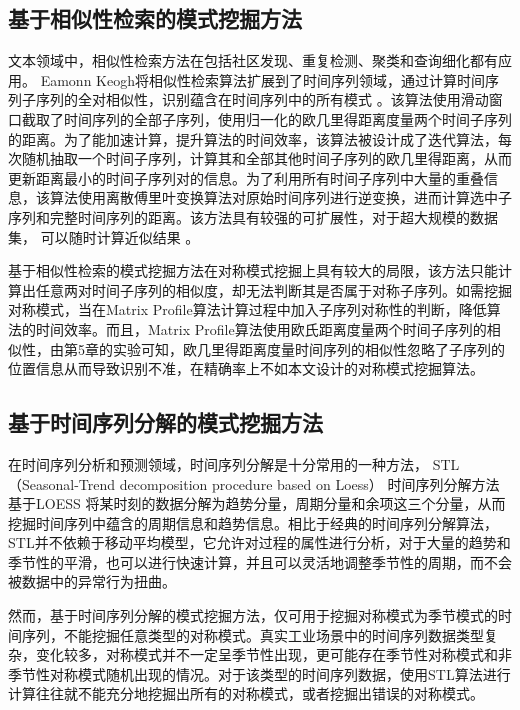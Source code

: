 \subsection{基于相似性检索的模式挖掘方法}
文本领域中，相似性检索方法在包括社区发现、重复检测、聚类和查询细化都有应用\cite{DBLP:conf/www/BayardoMS07}。
Eamonn Keogh将相似性检索算法扩展到了时间序列领域，通过计算时间序列子序列的全对相似性，识别蕴含在时间序列中的所有模式
\cite{DBLP:conf/kdd/RakthanmanonCMBWZZK12}。该算法使用滑动窗口截取了时间序列的全部子序列，使用归一化的欧几里得距离度量两个时间子序列的距离。为了能加速计算，提升算法的时间效率，该算法被设计成了迭代算法，每次随机抽取一个时间子序列，计算其和全部其他时间子序列的欧几里得距离，从而更新距离最小的时间子序列对的信息。为了利用所有时间子序列中大量的重叠信息，该算法使用离散傅里叶变换算法对原始时间序列进行逆变换，进而计算选中子序列和完整时间序列的距离。该方法具有较强的可扩展性，对于超大规模的数据集，
可以随时计算近似结果
\cite{DBLP:conf/icdm/ZhuZSYFMBK16}。

基于相似性检索的模式挖掘方法在对称模式挖掘上具有较大的局限，该方法只能计算出任意两对时间子序列的相似度，却无法判断其是否属于对称子序列。如需挖掘对称模式，当在Matrix Profile算法计算过程中加入子序列对称性的判断，降低算法的时间效率。而且，Matrix Profile算法使用欧氏距离度量两个时间子序列的相似性，由第5章的实验可知，欧几里得距离度量时间序列的相似性忽略了子序列的位置信息从而导致识别不准，在精确率上不如本文设计的对称模式挖掘算法。

\subsection{基于时间序列分解的模式挖掘方法}
在时间序列分析和预测领域，时间序列分解是十分常用的一种方法，
STL（Seasonal-Trend decomposition procedure based on Loess）\cite{DBLP:conf/www/BayardoMS07}
时间序列分解方法基于LOESS\cite{DBLP:books/lib/HastieTF09}
将某时刻的数据分解为趋势分量，周期分量和余项这三个分量，从而挖掘时间序列中蕴含的周期信息和趋势信息。相比于经典的时间序列分解算法，STL并不依赖于移动平均模型，它允许对过程的属性进行分析，对于大量的趋势和季节性的平滑，也可以进行快速计算，并且可以灵活地调整季节性的周期，而不会被数据中的异常行为扭曲。

然而，基于时间序列分解的模式挖掘方法，仅可用于挖掘对称模式为季节模式的时间序列，不能挖掘任意类型的对称模式。真实工业场景中的时间序列数据类型复杂，变化较多，对称模式并不一定呈季节性出现，更可能存在季节性对称模式和非季节性对称模式随机出现的情况。对于该类型的时间序列数据，使用STL算法进行计算往往就不能充分地挖掘出所有的对称模式，或者挖掘出错误的对称模式。

